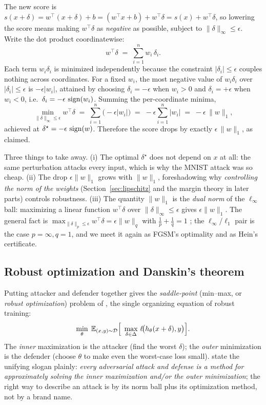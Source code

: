 \begin{solution}
The new score is $s(x+\delta) = w^\top(x+\delta)+b = (w^\top x + b) + w^\top\delta = s(x) + w^\top\delta$, so lowering the score means making $w^\top\delta$ as \emph{negative} as possible, subject to $\|\delta\|_\infty\le\epsilon$. Write the dot product coordinatewise:
\[
  w^\top\delta \;=\; \sum_{i=1}^n w_i\,\delta_i .
\]
Each term $w_i\delta_i$ is minimized independently because the constraint $|\delta_i|\le\epsilon$ couples nothing across coordinates. For a fixed $w_i$, the most negative value of $w_i\delta_i$ over $|\delta_i|\le\epsilon$ is $-\epsilon|w_i|$, attained by choosing $\delta_i=-\epsilon$ when $w_i>0$ and $\delta_i=+\epsilon$ when $w_i<0$, i.e.\ $\delta_i = -\epsilon\,\operatorname{sign}(w_i)$. Summing the per-coordinate minima,
\[
  \min_{\|\delta\|_\infty\le\epsilon} w^\top\delta \;=\; \sum_{i=1}^n \big(-\epsilon|w_i|\big) \;=\; -\epsilon\sum_{i=1}^n|w_i| \;=\; -\epsilon\,\|w\|_1 ,
\]
achieved at $\delta^\star=-\epsilon\,\operatorname{sign}(w)$. Therefore the score drops by exactly $\epsilon\,\|w\|_1$, as claimed.
\end{solution}

Three things to take away. (i) The optimal $\delta^\star$ does not depend on $x$ at all: the same perturbation attacks every input, which is why the MNIST attack was so cheap. (ii) The drop $\epsilon\|w\|_1$ grows with $\|w\|_1$, foreshadowing why \emph{controlling the norm of the weights} (Section~\ref{sec:lipschitz} and the margin theory in later parts) controls robustness. (iii) The quantity $\|w\|_1$ is the \emph{dual norm} of the $\ell_\infty$ ball: maximizing a linear function $w^\top\delta$ over $\|\delta\|_\infty\le\epsilon$ gives $\epsilon\|w\|_1$. The general fact is $\max_{\|\delta\|_p\le\epsilon} w^\top\delta = \epsilon\|w\|_q$ with $\tfrac1p+\tfrac1q=1$ \citep{kolter2018adversarial}; the $\ell_\infty$/$\ell_1$ pair is the case $p=\infty,q=1$, and we meet it again as FGSM's optimality and as Hein's certificate.

\subsection{Robust optimization and Danskin's theorem}
\label{sub:danskin}

Putting attacker and defender together gives the \emph{saddle-point} (min--max, or \emph{robust optimization}) problem of \citet{madry2018towards}, the single organizing equation of robust training:
\begin{equation}
  \label{eq:saddle}
  \min_{\theta}\; \mathbb{E}_{(x,y)\sim\mathcal D}\Big[\;\max_{\delta\in\Delta}\, \ell\!\big(h_\theta(x+\delta),y\big)\Big].
\end{equation}
The \emph{inner} maximization is the attacker (find the worst $\delta$); the \emph{outer} minimization is the defender (choose $\theta$ to make even the worst-case loss small). \citet{kolter2018adversarial} state the unifying slogan plainly: \emph{every adversarial attack and defense is a method for approximately solving the inner maximization and/or the outer minimization}; the right way to describe an attack is by its norm ball plus its optimization method, not by a brand name.

